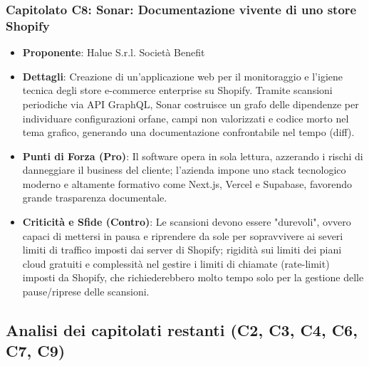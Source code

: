 \subsubsection{Capitolato C8: Sonar: Documentazione vivente di uno store Shopify}
\begin{itemize}
    \item \textbf{Proponente}: Halue S.r.l. Società Benefit

    \item \textbf{Dettagli}: Creazione di un'applicazione web per il monitoraggio e l'igiene tecnica degli store e-commerce enterprise su Shopify. Tramite scansioni periodiche via API GraphQL, Sonar costruisce un grafo delle dipendenze per individuare configurazioni orfane, campi non valorizzati e codice morto nel tema grafico, generando una documentazione confrontabile nel tempo (diff).

    \item \textbf{Punti di Forza (Pro)}: Il software opera in sola lettura, azzerando i rischi di danneggiare il business del cliente; l'azienda impone uno stack tecnologico moderno e altamente formativo come Next.js, Vercel e Supabase, favorendo grande trasparenza documentale.

    \item \textbf{Criticità e Sfide (Contro)}: Le scansioni devono essere "durevoli", ovvero capaci di mettersi in pausa e riprendere da sole per sopravvivere ai severi limiti di traffico imposti dai server di Shopify; rigidità sui limiti dei piani cloud gratuiti e complessità nel gestire i limiti di chiamate (rate-limit) imposti da Shopify, che richiederebbero molto tempo solo per la gestione delle pause/riprese delle scansioni. 

\end{itemize}

\subsection{Analisi dei capitolati restanti (C2, C3, C4, C6, C7, C9)}

